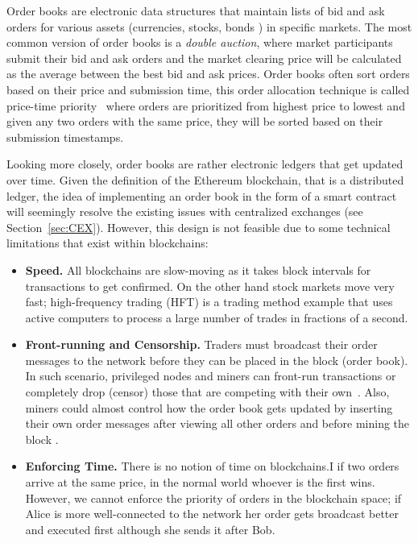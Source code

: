 Order books are electronic data structures that maintain lists of bid and ask orders for various assets (\eg currencies, stocks, bonds \etc) in specific markets. The most common version of order books is a \textit{double auction}, where market participants submit their bid and ask orders and the market clearing price will be calculated as the average between the best bid and ask prices. Order books often sort orders based on their price and submission time, this order allocation technique is called price-time priority~\cite{preis2011price} where orders are prioritized from highest price to lowest and given any two orders with the same price, they will be sorted based on their submission timestamps.

Looking more closely, order books are rather electronic ledgers that get updated over time. Given the definition of the Ethereum blockchain, that is a distributed ledger, the idea of implementing an order book in the form of a smart contract will seemingly resolve the existing issues with centralized exchanges (see Section~\ref{sec:CEX}). However, this design is not feasible due to some technical limitations that exist within blockchains:

\begin{itemize}

\item \textbf{Speed.} All blockchains are slow-moving as it takes block intervals for transactions to get confirmed. On the other hand stock markets move very fast;  high-frequency trading (HFT) is a trading method example that uses active computers to process a large number of trades in fractions of a second. 


\item \textbf{Front-running and Censorship.} Traders must broadcast their order messages to the network before they can be placed in the block (\ie order book). In such scenario, privileged nodes and miners can front-run transactions or completely drop (censor) those that are competing with their own~\cite{eskandari2019sok}. Also, miners could almost control how the order book gets updated by inserting their own order messages after viewing all other orders and before mining the block .


\item \textbf{Enforcing Time.} There is no notion of time on blockchains.I if two orders arrive at the same price, in the normal world whoever is the first wins. However, we cannot enforce the priority of orders in the blockchain space; if Alice is more well-connected to the network her order gets broadcast better and executed first although she sends it after Bob. 

\end{itemize}


